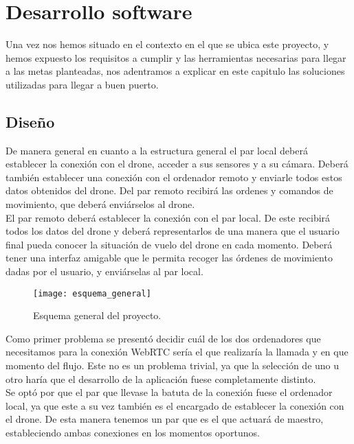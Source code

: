 \chapter{Desarrollo software}

Una vez nos hemos situado en el contexto en el que se ubica este proyecto, y hemos expuesto los requisitos a cumplir y las herramientas necesarias para llegar a las metas planteadas, nos adentramos a explicar en este capitulo las soluciones utilizadas para llegar a buen puerto.\\

\section{Diseño}

De manera general en cuanto a la estructura general el par local deberá establecer la conexión con el drone, acceder a sus sensores y a su cámara. Deberá también establecer una conexión con el ordenador remoto y enviarle todos estos datos obtenidos del drone. Del par remoto recibirá las ordenes y comandos de movimiento, que deberá enviárselos al drone.\\

El par remoto deberá establecer la conexión con el par local. De este recibirá todos los datos del drone y deberá representarlos de una manera que el usuario final pueda conocer la situación de vuelo del drone en cada momento. Deberá tener una interfaz amigable que le permita recoger las órdenes de movimiento dadas por el usuario, y enviárselas al par local.\\

\begin{figure}[h!]
\centering
\texttt{[image: esquema\_general]}
\caption{Esquema general del proyecto.}
\label{fig:esquemageneral}
\end{figure}

Como primer problema se presentó decidir cuál de los dos ordenadores que necesitamos para la conexión WebRTC sería el que realizaría la llamada y en que momento del flujo. Este no es un problema trivial, ya que la selección de uno u otro haría que el desarrollo de la aplicación fuese completamente distinto.\\

Se optó por que el par que llevase la batuta de la conexión fuese el ordenador local, ya que este a su vez también es el encargado de  establecer la conexión con el drone. De esta manera tenemos un par que es el que actuará de maestro, estableciendo ambas conexiones en los momentos oportunos.\\

